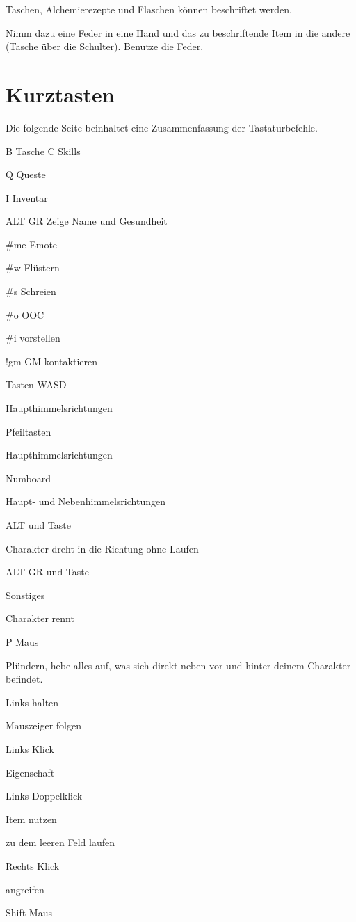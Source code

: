 \documentclass[a4paper,11pt]{book}
\begin{document}
Taschen, Alchemierezepte und Flaschen können beschriftet werden.

Nimm dazu eine Feder in eine Hand und das zu beschriftende Item in die andere (Tasche über die Schulter). Benutze die Feder.



\section{Kurztasten}

Die folgende Seite beinhaltet eine Zusammenfassung der Tastaturbefehle.

B  Tasche C  Skills

Q  Queste

I  Inventar

ALT GR  Zeige Name und Gesundheit

\#me  Emote

\#w  Flüstern

\#s  Schreien

\#o  OOC

\#i  vorstellen

!gm  GM kontaktieren

Tasten WASD

Haupthimmelsrichtungen

Pfeiltasten

Haupthimmelsrichtungen

Numboard

Haupt- und Nebenhimmelsrichtungen

ALT und Taste

Charakter dreht in die Richtung ohne Laufen

ALT GR und Taste

Sonstiges

Charakter rennt

P Maus

Plündern, hebe alles auf, was sich direkt neben vor und hinter deinem Charakter befindet.

Links halten

Mauszeiger folgen

Links Klick

Eigenschaft

Links Doppelklick

Item nutzen

zu dem leeren Feld laufen

Rechts Klick

angreifen

Shift Maus
\end{document}
